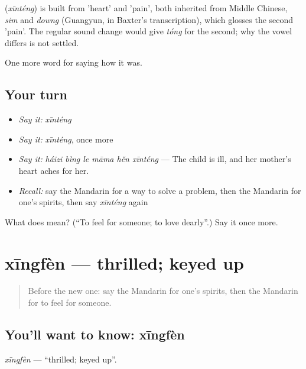 \begin{cousinweb}
\textbf{} (\emph{xīnténg}) is built from  'heart' and  'pain', both inherited from Middle Chinese, \emph{sim} and \emph{downg} (Guangyun, in Baxter's transcription), which glosses the second 'pain'. The regular sound change would give \emph{tóng} for the second; why the vowel differs is not settled.
\end{cousinweb}

\begin{grammarlens}[title={What you've built}]
One more word for saying how it was.
\end{grammarlens}

\subsection*{Your turn}
\begin{itemize}
\raggedright
  \item \emph{Say it:} \emph{xīnténg}
  \item \emph{Say it:} \emph{xīnténg}, once more
  \item \emph{Say it:} \emph{háizi bìng le māma hěn xīnténg} — The child is ill, and her mother's heart aches for her.
  \item \emph{Recall:} say the Mandarin for a way to solve a problem, then the Mandarin for one's spirits, then say \emph{xīnténg} again
\end{itemize}

\begin{tcolorbox}[breakable,colback=teal!4,colframe=teal!35!black,title={Before you move on}]
What does  mean? (\textquotedblleft{}To feel for someone; to love dearly\textquotedblright{}.) Say it once more.
\end{tcolorbox}
\section[xīngfèn]{xīngfèn — thrilled; keyed up}

\label{lesson:ZH-C458-xingfen}



\begin{quote}
Before the new one: say the Mandarin for one's spirits, then the Mandarin for to feel for someone.
\end{quote}

\subsection*{You'll want to know: xīngfèn}
\emph{xīngfèn} — \textquotedblleft{}thrilled; keyed up\textquotedblright{}.

